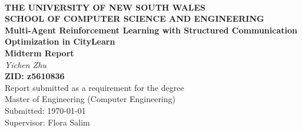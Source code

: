 ﻿\begin{center} ~
\vspace*{2cm} \\
\textbf{\large THE UNIVERSITY OF NEW SOUTH WALES} \\[1ex]
\textbf{\large SCHOOL OF COMPUTER SCIENCE AND ENGINEERING} \\[3cm]
\textbf{\Huge Multi-Agent Reinforcement Learning with Structured Communication Optimization in CityLearn} \\[1.5cm]
\textbf{\Large Midterm Report} \\[1.5cm]
\textit{\huge Yichen Zhu} \\[1cm]
\textbf{\Large ZID: z5610836} \\[1.5cm]
{\Large
Report submitted as a requirement for the degree\\
Master of Engineering (Computer Engineering) \\[2ex]
Submitted: \today \\[2ex]
Supervisor: Flora Salim
}
\end{center}

